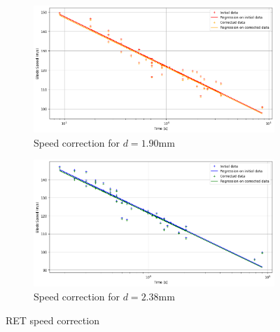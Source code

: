 \documentclass[10pt]{report}
\begin{document}
\begin{figure}[H]
    \centering
    \begin{subfigure}[b]{0.7\textwidth}
        \includegraphics[width=\textwidth]{figures/ret_analysis_190.png}
        \caption{Speed correction for $d = 1.90 \mathrm{mm}$}
    \end{subfigure}
    \hfill
    \begin{subfigure}[b]{0.7\textwidth}
        \includegraphics[width=\textwidth]{figures/ret_analysis_238.png}
        \caption{Speed correction for $d = 2.38 \mathrm{mm}$}
    \end{subfigure}
    \caption{RET speed correction}
    \label{fig:rain_tester}
\end{figure}
\end{document}
